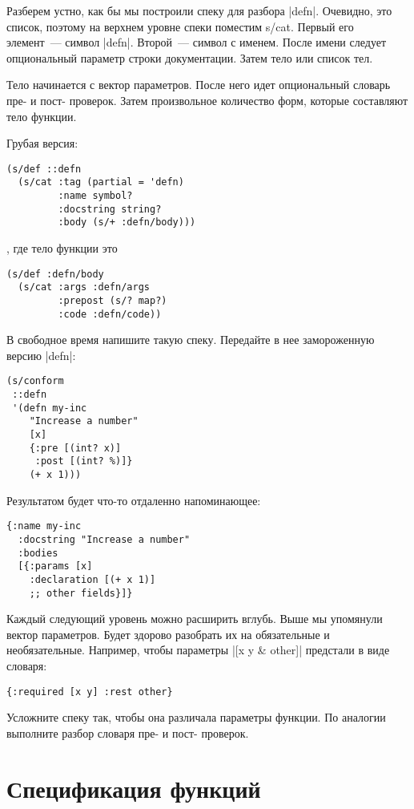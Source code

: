 Разберем устно, как бы мы построили спеку для разбора \spverb|defn|. Очевидно, это
список, поэтому на верхнем уровне спеки поместим s/cat. Первый его элемент~---
символ \spverb|defn|. Второй~--- символ с именем. После имени следует опциональный параметр
строки документации. Затем тело или список тел.

Тело начинается с вектор параметров. После него идет опциональный словарь пре- и
пост- проверок. Затем произвольное количество форм, которые составляют тело
функции.

Грубая версия:

\begin{verbatim}
(s/def ::defn
  (s/cat :tag (partial = 'defn)
         :name symbol?
         :docstring string?
         :body (s/+ :defn/body)))
\end{verbatim}

, где тело функции это

\begin{verbatim}
(s/def :defn/body
  (s/cat :args :defn/args
         :prepost (s/? map?)
         :code :defn/code))
\end{verbatim}

В свободное время напишите такую спеку. Передайте в нее замороженную версию
\spverb|defn|:

\begin{verbatim}
(s/conform
 ::defn
 '(defn my-inc
    "Increase a number"
    [x]
    {:pre [(int? x)]
     :post [(int? %)]}
    (+ x 1)))
\end{verbatim}

Результатом будет что-то отдаленно напоминающее:

\begin{verbatim}
{:name my-inc
  :docstring "Increase a number"
  :bodies
  [{:params [x]
    :declaration [(+ x 1)]
    ;; other fields}]}
\end{verbatim}

Каждый следующий уровень можно расширить вглубь. Выше мы упомянули вектор
параметров. Будет здорово разобрать их на обязательные и
необязательные. Например, чтобы параметры \spverb|[x y & other]| предстали в виде
словаря:

\begin{verbatim}
{:required [x y] :rest other}
\end{verbatim}

Усложните спеку так, чтобы она различала параметры функции. По аналогии
выполните разбор словаря пре- и пост- проверок.

\section{Спецификация функций}

